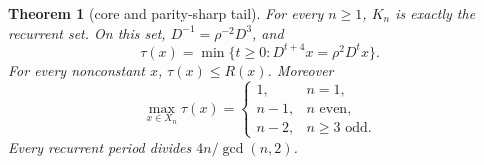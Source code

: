 \documentclass[a4paper,10pt]{amsart}
\newtheorem{theorem}{Theorem}[section]
\theoremstyle{remark}
\begin{document}
\begin{theorem}[core and parity-sharp tail]\label{thm:tail}
For every $n\ge1$, $K_n$ is exactly the recurrent set. On this set,
$D^{-1}=\rho^{-2}D^3$, and
\begin{equation}\label{eq:clock}
\tau(x)=\min\{t\ge0:D^{t+4}x=\rho^2D^t x\}.
\end{equation}
For every nonconstant $x$, $\tau(x)\le R(x)$. Moreover
\begin{equation}\label{eq:height}
\max_{x\in X_n}\tau(x)=
\begin{cases}1,&n=1,\\n-1,&n\text{ even},\\n-2,&n\ge3\text{ odd}.
\end{cases}
\end{equation}
Every recurrent period divides $4n/\gcd(n,2)$.
\end{theorem}
\end{document}
